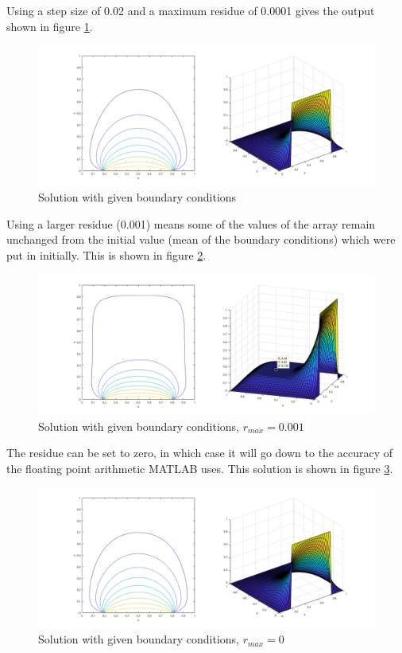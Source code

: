 \documentclass[11pt, oneside, titlepage]{article}   	%
\begin{document}
Using a step size of 0.02 and a maximum residue of 0.0001 gives the output shown in figure \ref{fig:relaxation1}.

\begin{figure}[H]
\includegraphics[width = \textwidth]{relaxation1_1}
\caption{Solution with given boundary conditions} \label{fig:relaxation1}
\end{figure}


Using a larger residue (0.001) means some of the values of the array remain unchanged from the initial value (mean of the boundary conditions) which were put in initially. This is shown in figure \ref{fig:relaxation1a}.

\begin{figure}[H]
	\includegraphics[width = \textwidth]{relaxation1_1a}
	\caption{Solution with given boundary conditions, $r_{max} = 0.001$} \label{fig:relaxation1a}
\end{figure}

The residue can be set to zero, in which case it will go down to the accuracy of the floating point arithmetic MATLAB uses. This solution is shown in figure \ref{fig:relaxation1b}.

\begin{figure}[H]
	\includegraphics[width = \textwidth]{relaxation1_1b}
	\caption{Solution with given boundary conditions, $r_{max} = 0$} \label{fig:relaxation1b}
\end{figure}
\end{document}
